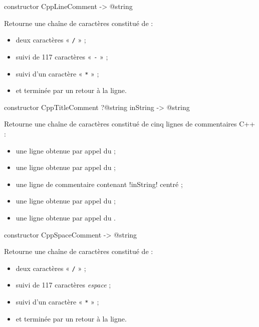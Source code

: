 
\begin{galgasbox}
constructor CppLineComment -> @string
\end{galgasbox}

Retourne une chaîne de caractères constitué de :
\begin{itemize}
  \item deux caractères « \texttt{/} » ;
  \item suivi de 117 caractères « \texttt{-} » ;
  \item suivi d'un caractère « \texttt{*} » ;
  \item et terminée par un retour à la ligne.
\end{itemize}





\begin{galgasbox}
constructor CppTitleComment ?@string inString -> @string
\end{galgasbox}

Retourne une chaîne de caractères constitué de cinq lignes de commentaires C++ :
\begin{itemize}
\item une ligne obtenue par appel du  ;
\item une ligne obtenue par appel du  ;
\item une ligne de commentaire contenant \ggs!inString! centré ;
\item une ligne obtenue par appel du  ;
\item une ligne obtenue par appel du .
\end{itemize}




\begin{galgasbox}
constructor CppSpaceComment -> @string
\end{galgasbox}

Retourne une chaîne de caractères constitué de :
\begin{itemize}
  \item deux caractères « \texttt{/} » ;
  \item suivi de 117 caractères \emph{espace} ;
  \item suivi d'un caractère « \texttt{*} » ;
  \item et terminée par un retour à la ligne.
\end{itemize}


